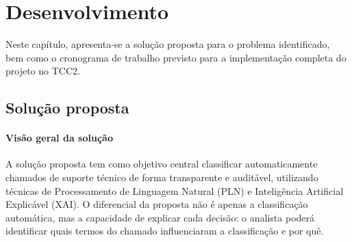 \documentclass[
    12pt,                %
    openright,           %
    oneside,             %
    a4paper,             %
    english,             %
    brazil               %
]{abntex2}
\begin{document}


\chapter{Desenvolvimento}
\label{cap:desenvolvimento}

Neste capítulo, apresenta-se a solução proposta para o problema identificado, bem como o cronograma de trabalho previsto para a implementação completa do projeto no TCC2.

\section{Solução proposta}
\label{sec:solucao}

\subsubsection{Visão geral da solução}

A solução proposta tem como objetivo central classificar 
automaticamente chamados de suporte técnico de forma transparente 
e auditável, utilizando técnicas de Processamento de Linguagem 
Natural (PLN) e Inteligência Artificial Explicável (XAI). O 
diferencial da proposta não é apenas a classificação automática, 
mas a capacidade de explicar cada decisão: o analista poderá 
identificar quais termos do chamado influenciaram a classificação 
e por quê.
\end{document}
